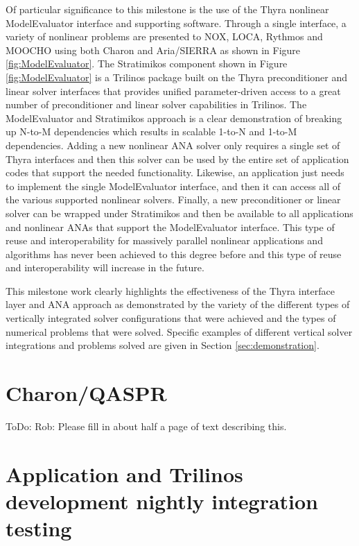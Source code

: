 \documentclass[pdf,ps2pdf,11pt]{SANDreport}
\begin{document}
Of particular significance to this milestone is the use of the Thyra nonlinear
ModelEvaluator interface and supporting software.  Through a single interface,
a variety of nonlinear problems are presented to NOX, LOCA, Rythmos and MOOCHO
using both Charon and Aria/SIERRA as shown in Figure
{}\ref{fig:ModelEvaluator}.  The Stratimikos component shown in Figure
{}\ref{fig:ModelEvaluator} is a Trilinos package built on the Thyra
preconditioner and linear solver interfaces that provides unified
parameter-driven access to a great number of preconditioner and linear solver
capabilities in Trilinos.  The ModelEvaluator and Stratimikos approach is a
clear demonstration of breaking up N-to-M dependencies which results in
scalable 1-to-N and 1-to-M dependencies.  Adding a new nonlinear ANA solver
only requires a single set of Thyra interfaces and then this solver can be
used by the entire set of application codes that support the needed
functionality.  Likewise, an application just needs to implement the single
ModelEvaluator interface, and then it can access all of the various supported
nonlinear solvers.  Finally, a new preconditioner or linear solver can be
wrapped under Stratimikos and then be available to all applications and
nonlinear ANAs that support the ModelEvaluator interface.  This type of reuse
and interoperability for massively parallel nonlinear applications and
algorithms has never been achieved to this degree before and this type of
reuse and interoperability will increase in the future.

This milestone work clearly highlights the effectiveness of the Thyra interface
layer and ANA approach as demonstrated by the variety of the different types
of vertically integrated solver configurations that were achieved and the
types of numerical problems that were solved.  Specific examples of different
vertical solver integrations and problems solved are given in Section
{}\ref{sec:demonstration}.


%
\section{Charon/QASPR}
%

ToDo: Rob: Please fill in about half a page of text describing this.


%
\section{Application and Trilinos development nightly integration testing}
%
\end{document}
